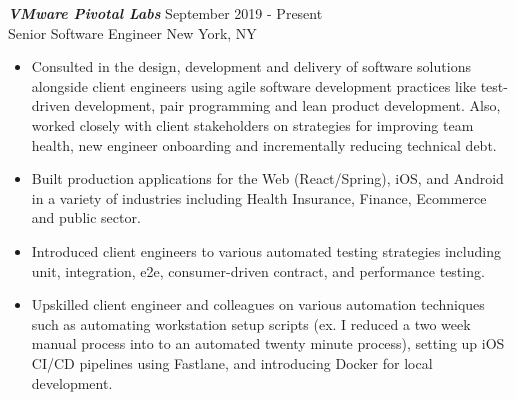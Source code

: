 {\sl \textbf{VMware Pivotal Labs}} \hfill September 2019 - Present \\ Senior Software Engineer \hfill New York, NY
\begin{itemize}
    \item Consulted in the design, development and delivery of software solutions alongside client engineers using agile software development practices like test-driven development, pair programming and lean product development. Also, worked closely with client stakeholders on strategies for improving team health, new engineer onboarding and incrementally reducing technical debt.
    \item Built production applications for the Web (React/Spring), iOS, and Android in a variety of industries including Health Insurance, Finance, Ecommerce and public sector.
    \item Introduced client engineers to various automated testing strategies including unit, integration, e2e, consumer-driven contract, and performance testing.
    \item Upskilled client engineer and colleagues on various automation techniques such as automating workstation setup scripts (ex. I reduced a two week manual process into to an automated twenty minute process), setting up iOS CI/CD pipelines using Fastlane, and introducing Docker for local development.
\end{itemize}
